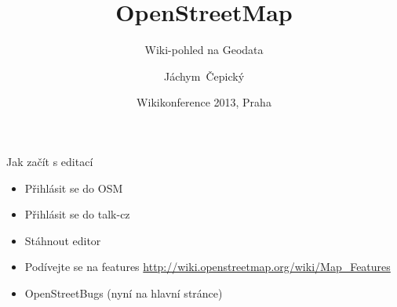 \documentclass[xcolor=dvipsnames]{beamer}
\title[OpenStreetMap] %
{OpenStreetMap}
\subtitle {Wiki-pohled na Geodata}
\author[J. Čepický] %
{Jáchym~Čepický\inst{1}\inst{2}}
\institute %
{
  \inst{1}%
  Open Source Geospatial Foundation
  \url{http://osgeo.org}\\

  \inst{2}%
  Geosense s.r.o.
  \url{http://geosense.cz}\\
}
\date[] %
{Wikikonference 2013, Praha}
\begin{document}
\begin{frame}
  \titlepage
\end{frame}






\begin{frame}{Jak začít s editací}
\begin{itemize}
    \item Přihlásit se do OSM
    \item Přihlásit se do talk-cz
    \item Stáhnout editor
    \item Podívejte se na features \href{http://wiki.openstreetmap.org/wiki/Map\_Features}{http://wiki.openstreetmap.org/wiki/Map\_Features}
    \item OpenStreetBugs (nyní na hlavní stránce)
\end{itemize}
\end{frame}
\end{document}

